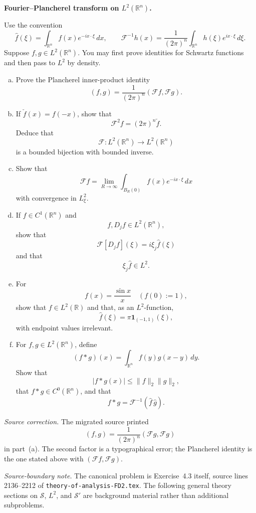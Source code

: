 \begin{problem}[CP-III-0013]
\label{prob:cp-iii-0013}
\textbf{Fourier--Plancherel transform on \(L^2(\mathbb R^n)\).}

Use the convention
\[
\widehat f(\xi)
=
\int_{\mathbb R^n}
f(x)e^{-ix\cdot\xi}\,dx,
\qquad
\mathcal F^{-1}h(x)
=
\frac1{(2\pi)^n}
\int_{\mathbb R^n}
h(\xi)e^{ix\cdot\xi}\,d\xi.
\]
Suppose \(f,g\in L^2(\mathbb R^n)\). You may first prove identities for
Schwartz functions and then pass to \(L^2\) by density.

\begin{enumerate}[(a)]
\item Prove the Plancherel inner-product identity
\[
(f,g)
=
\frac1{(2\pi)^n}
(\mathcal Ff,\mathcal Fg).
\]

\item If \(\check f(x)=f(-x)\), show that
\[
\mathcal F^2f
=
(2\pi)^n\check f.
\]
Deduce that
\[
\mathcal F:L^2(\mathbb R^n)\to L^2(\mathbb R^n)
\]
is a bounded bijection with bounded inverse.

\item Show that
\[
\mathcal Ff
=
\lim_{R\to\infty}
\int_{B_R(0)}
f(x)e^{-ix\cdot\xi}\,dx
\]
with convergence in \(L^2_\xi\).

\item If \(f\in C^1(\mathbb R^n)\) and
\[
f,D_jf\in L^2(\mathbb R^n),
\]
show that
\[
\mathcal F[D_jf](\xi)
=
i\xi_j\widehat f(\xi)
\]
and that
\[
\xi_j\widehat f\in L^2.
\]

\item For
\[
f(x)=\frac{\sin x}{x}
\quad
(f(0):=1),
\]
show that \(f\in L^2(\mathbb R)\) and that, as an \(L^2\)-function,
\[
\widehat f(\xi)
=
\pi\mathbf1_{(-1,1)}(\xi),
\]
with endpoint values irrelevant.

\item For \(f,g\in L^2(\mathbb R^n)\), define
\[
(f*g)(x)
=
\int_{\mathbb R^n}
f(y)g(x-y)\,dy.
\]
Show that
\[
|f*g(x)|
\le
\|f\|_2\|g\|_2,
\]
that \(f*g\in C^0(\mathbb R^n)\), and that
\[
f*g
=
\mathcal F^{-1}(\widehat f\,\widehat g).
\]
\end{enumerate}

\medskip
\noindent
\textit{Source correction.}
The migrated source printed
\[
(f,g)
=
\frac1{(2\pi)^n}
(\mathcal Fg,\mathcal Fg)
\]
in part~(a). The second factor is a typographical error; the Plancherel
identity is the one stated above with \((\mathcal Ff,\mathcal Fg)\).

\medskip
\noindent
\textit{Source-boundary note.}
The canonical problem is Exercise~4.3 itself, source lines 2136--2212 of
\texttt{theory-of-analysis-FD2.tex}. The following general theory sections on
\(\mathcal S\), \(L^2\), and \(\mathcal S'\) are background material rather
than additional subproblems.
\end{problem}

